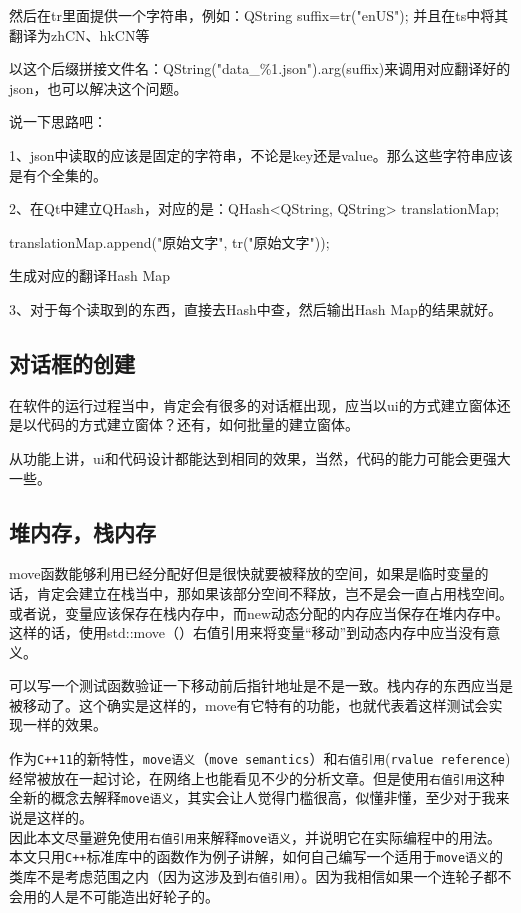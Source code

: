 然后在tr里面提供一个字符串，例如：QString suffix=tr("enUS"); 并且在ts中将其翻译为zhCN、hkCN等

以这个后缀拼接文件名：QString("data\_\%1.json").arg(suffix)来调用对应翻译好的json，也可以解决这个问题。

说一下思路吧：

1、json中读取的应该是固定的字符串，不论是key还是value。那么这些字符串应该是有个全集的。

2、在Qt中建立QHash，对应的是：QHash<QString, QString> translationMap;

translationMap.append("原始文字", tr("原始文字"));

生成对应的翻译Hash Map

3、对于每个读取到的东西，直接去Hash中查，然后输出Hash Map的结果就好。

\subsection{对话框的创建}
在软件的运行过程当中，肯定会有很多的对话框出现，应当以ui的方式建立窗体还是以代码的方式建立窗体？还有，如何批量的建立窗体。

从功能上讲，ui和代码设计都能达到相同的效果，当然，代码的能力可能会更强大一些。
\subsection{堆内存，栈内存}
move函数能够利用已经分配好但是很快就要被释放的空间，如果是临时变量的话，肯定会建立在栈当中，那如果该部分空间不释放，岂不是会一直占用栈空间。或者说，变量应该保存在栈内存中，而new动态分配的内存应当保存在堆内存中。这样的话，使用std::move（）右值引用来将变量“移动”到动态内存中应当没有意义。

可以写一个测试函数验证一下移动前后指针地址是不是一致。栈内存的东西应当是被移动了。这个确实是这样的，move有它特有的功能，也就代表着这样测试会实现一样的效果。

作为\texttt{C++11}的新特性，\texttt{move语义}（\texttt{move\ semantics}）和\texttt{右值引用}(\texttt{rvalue\ reference})经常被放在一起讨论，在网络上也能看见不少的分析文章。但是使用\texttt{右值引用}这种全新的概念去解释\texttt{move语义}，其实会让人觉得门槛很高，似懂非懂，至少对于我来说是这样的。\\
因此本文尽量避免使用\texttt{右值引用}来解释\texttt{move语义}，并说明它在实际编程中的用法。本文只用\texttt{C++}标准库中的函数作为例子讲解，如何自己编写一个适用于\texttt{move语义}的类库不是考虑范围之内（因为这涉及到\texttt{右值引用}）。因为我相信如果一个连轮子都不会用的人是不可能造出好轮子的。

